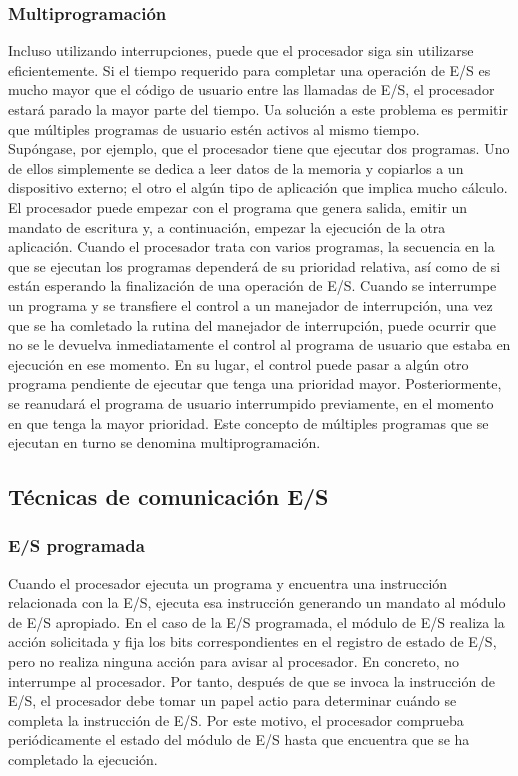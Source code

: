 \documentclass{article}
\begin{document}
						
						\subsubsection{Multiprogramación}
							Incluso utilizando interrupciones, puede que el procesador siga sin utilizarse eficientemente. Si el tiempo requerido para completar una operación de E/S es mucho mayor que el código de usuario entre las llamadas de E/S, el procesador estará parado la mayor parte del tiempo. Ua solución a este problema es permitir que múltiples programas de usuario estén activos al mismo tiempo. \\
							
							Supóngase, por ejemplo, que el procesador tiene que ejecutar dos programas. Uno de ellos simplemente se dedica a leer datos de la memoria y copiarlos a un dispositivo externo; el otro el algún tipo de aplicación que implica mucho cálculo. El procesador puede empezar con el programa que genera salida, emitir un mandato de escritura y, a continuación, empezar la ejecución de la otra aplicación. Cuando el procesador trata con varios programas, la secuencia en la que se ejecutan los programas dependerá de su prioridad relativa, así como de si están esperando la finalización de una operación de E/S. Cuando se interrumpe un programa y se transfiere el control a un manejador de interrupción, una vez que se ha comletado la rutina del manejador de interrupción, puede ocurrir que no se le devuelva inmediatamente el control al programa de usuario que estaba en ejecución en ese momento. En su lugar, el control puede pasar a algún otro programa pendiente de ejecutar que tenga una prioridad mayor. Posteriormente, se reanudará el programa de usuario interrumpido previamente, en el momento en que tenga la mayor prioridad. Este concepto de múltiples programas que se ejecutan en turno se denomina multiprogramación.
							
					\subsection{Técnicas de comunicación E/S}
						\subsubsection{E/S programada}
							Cuando el procesador ejecuta un programa y encuentra una instrucción relacionada con la E/S, ejecuta esa instrucción generando un mandato al módulo de E/S apropiado. En el caso de la E/S programada, el módulo de E/S realiza la acción solicitada y fija los bits correspondientes en el registro de estado de E/S, pero no realiza ninguna acción para avisar al procesador. En concreto, no interrumpe al procesador. Por tanto, después de que se invoca la instrucción de E/S, el procesador debe tomar un papel actio para determinar cuándo se completa la instrucción de E/S. Por este motivo, el procesador comprueba periódicamente el estado del módulo de E/S hasta que encuentra que se ha completado la ejecución.  \\ 
							
\end{document}
